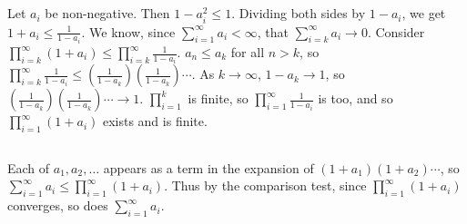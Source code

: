 \documentclass[11pt]{article}
\begin{document}
\subsection{} %
Let $a_i$ be non-negative.
Then $1-a_i^2\le1$.
Dividing both sides by $1-a_i$, we get $1+a_i\le\frac{1}{1-a_i}$.
We know, since $\sum_{i=1}^\infty a_i<\infty$, that $\sum_{i=k}^\infty a_i\rightarrow0$.
Consider $\prod_{i=k}^\infty(1+a_i)\le\prod_{i=k}^\infty\frac{1}{1-a_i}$.
$a_n\le a_k$ for all $n>k$, so $\prod_{i=k}^\infty\frac{1}{1-a_i}\le\left(\frac{1}{1-a_k}\right)\left(\frac{1}{1-a_k}\right)\cdots$.
As $k\rightarrow\infty$, $1-a_k\rightarrow1$, so $\left(\frac{1}{1-a_k}\right)\left(\frac{1}{1-a_k}\right)\cdots\rightarrow1$.
$\prod_{i=1}^k$ is finite, so $\prod_{i=1}^\infty\frac{1}{1-a_i}$ is too, and so $\prod_{i=1}^\infty(1+a_i)$ exists and is finite.


\subsection{} %
Each of $a_1,a_2,\ldots$ appears as a term in the expansion of $(1+a_1)(1+a_2)\cdots$, so $\sum_{i=1}^\infty a_i\le\prod_{i=1}^\infty(1+a_i)$.
Thus by the comparison test, since $\prod_{i=1}^\infty(1+a_i)$ converges, so does  $\sum_{i=1}^\infty a_i$.
\end{document}
